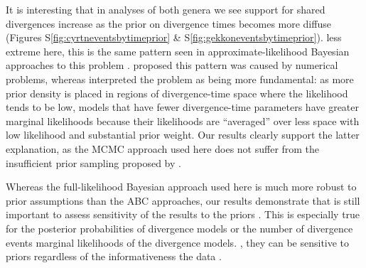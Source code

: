 


It is interesting that in analyses of both genera we see support for shared
divergences increase as the prior on divergence times becomes more diffuse
(Figures
S\ref{fig:cyrtneventsbytimeprior}
\&
S\ref{fig:gekkoneventsbytimeprior}).
 less extreme here, this is the same pattern seen in
approximate-likelihood Bayesian approaches to this problem
\citep{Oaks2012,Hickerson2013,Oaks2014reply}.
\citet{Hickerson2013} proposed this pattern was caused by numerical problems,
whereas \citet{Oaks2014reply} interpreted the problem as being more
fundamental:
as more prior density is placed in regions of divergence-time space where the
likelihood tends to be low, models that have fewer divergence-time parameters
have greater marginal likelihoods because their likelihoods are ``averaged''
over less space with low likelihood and substantial prior weight.
Our results clearly support the latter explanation, as the MCMC approach used
here does not suffer from the insufficient prior sampling proposed by
\citet{Hickerson2013}.

Whereas the full-likelihood Bayesian approach used here is much more robust to
prior assumptions than the ABC approaches, our results demonstrate that  is
still important to assess sensitivity of the results to the priors
\citep{Oaks2012}.
This is especially true for the posterior probabilities of divergence models or
the number of divergence events
marginal likelihoods of the divergence models.
, they can be sensitive to  priors regardless of the
informativeness the data \citep{Oaks2018marginal}.

